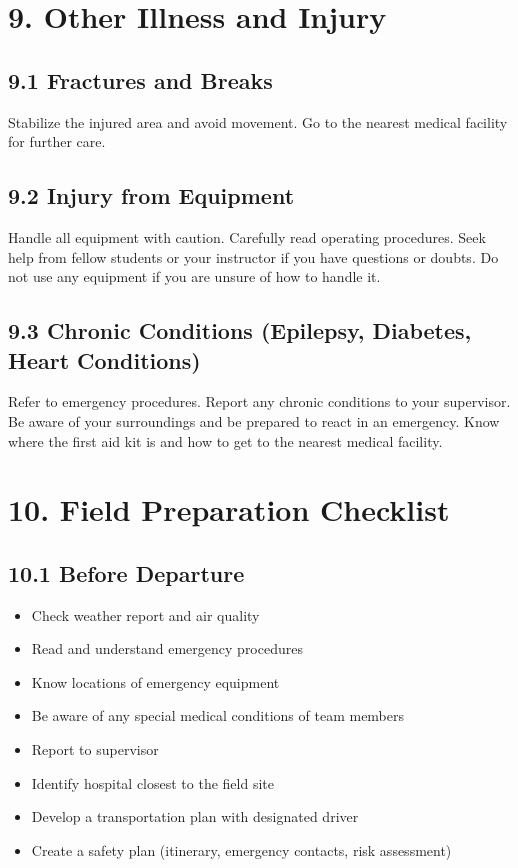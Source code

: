 \documentclass[
  11pt,
  letterpaper,
]{article}
\providecommand{\tightlist}{%
  \setlength{\itemsep}{0pt}\setlength{\parskip}{0pt}}
\begin{document}
\section{9. Other Illness and Injury}\label{other-illness-and-injury}

\subsection{9.1 Fractures and Breaks}\label{fractures-and-breaks}

Stabilize the injured area and avoid movement. Go to the nearest medical
facility for further care.

\subsection{9.2 Injury from Equipment}\label{injury-from-equipment}

Handle all equipment with caution. Carefully read operating procedures.
Seek help from fellow students or your instructor if you have questions
or doubts. Do not use any equipment if you are unsure of how to handle
it.

\subsection{9.3 Chronic Conditions (Epilepsy, Diabetes, Heart
Conditions)}\label{chronic-conditions-epilepsy-diabetes-heart-conditions}

Refer to emergency procedures. Report any chronic conditions to your
supervisor. Be aware of your surroundings and be prepared to react in an
emergency. Know where the first aid kit is and how to get to the nearest
medical facility.

\section{10. Field Preparation
Checklist}\label{field-preparation-checklist}

\subsection{10.1 Before Departure}\label{before-departure}

\begin{itemize}
\tightlist
\item[$\square$]
  Check weather report and air quality
\item[$\square$]
  Read and understand emergency procedures
\item[$\square$]
  Know locations of emergency equipment
\item[$\square$]
  Be aware of any special medical conditions of team members
\item[$\square$]
  Report to supervisor
\item[$\square$]
  Identify hospital closest to the field site
\item[$\square$]
  Develop a transportation plan with designated driver
\item[$\square$]
  Create a safety plan (itinerary, emergency contacts, risk assessment)
\end{itemize}
\end{document}

